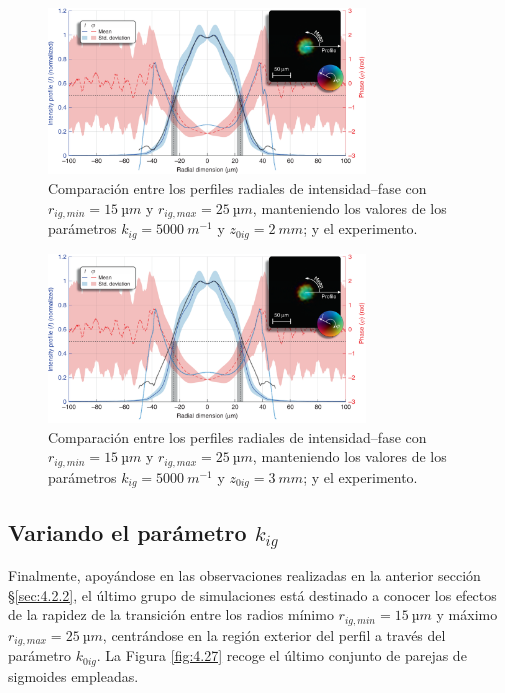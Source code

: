 \begin{figure}[htbp!]
  \centering
  \includegraphics[width=0.75\textwidth]{Figuras/ch4_cmp51.png}
  \caption{Comparación entre los perfiles radiales de intensidad--fase con $r_{ig,min}=\qty{15}{µm}$ y $r_{ig,max}=\qty{25}{µm}$, manteniendo los valores de los parámetros $k_{ig}=\qty{5000}{m^{-1}}$ y $z_{0ig}=\qty{2}{mm}$; y el experimento.}
  \label{fig:4.24}
\end{figure}

\begin{figure}[htbp!]
  \centering
  \includegraphics[width=0.75\textwidth]{Figuras/ch4_cmp52.png}
  \caption{Comparación entre los perfiles radiales de intensidad--fase con $r_{ig,min}=\qty{15}{µm}$ y $r_{ig,max}=\qty{25}{µm}$, manteniendo los valores de los parámetros $k_{ig}=\qty{5000}{m^{-1}}$ y $z_{0ig}=\qty{3}{mm}$; y el experimento.}
  \label{fig:4.25}
\end{figure}

\subsection{Variando el parámetro $k_{ig}$}\label{4.2.3}
Finalmente, apoyándose en las observaciones realizadas en la anterior sección \S\ref{sec:4.2.2}, el último grupo de simulaciones está destinado a conocer los efectos de la rapidez de la transición entre los radios mínimo $r_{ig,min}=\qty{15}{µm}$ y máximo $r_{ig,max}=\qty{25}{µm}$, centrándose en la región exterior del perfil a través del parámetro $k_{0ig}$. La Figura \ref{fig:4.27} recoge el último conjunto de parejas de sigmoides empleadas.

